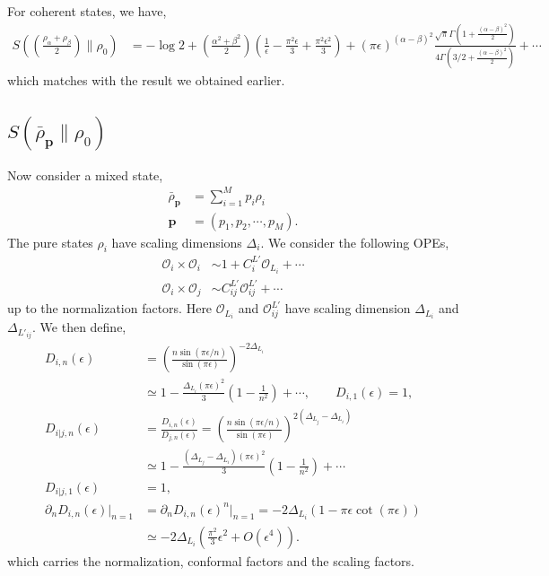 \documentclass[11pt]{article}
\newcommand{\ep}{\epsilon}
\newcommand{\p}{\partial}
\newcommand{\mO}{\mathcal{O}}
\newcommand{\lb}{\left(}
\newcommand{\rb}{\right)}
\begin{document}
For coherent states, we have,
\begin{align}
    S\lb \lb\frac{\rho_\alpha + \rho_\beta}{2}\rb\Big\| \rho_0\rb &= -\log 2+ \lb\frac{\alpha^2 + \beta^2}{2}\rb \lb\frac{1}{\ep} - \frac{\pi^2\ep}{3} + \frac{\pi^2\ep^2}{3} \rb + \lb\pi \ep\rb^{(\alpha-\beta)^2} \frac{\sqrt \pi \Gamma\lb1+\frac{(\alpha-\beta)^2}{2}\rb}{4\Gamma\lb3/2 + \frac{(\alpha-\beta)^2}{2}\rb}+\cdots
\end{align}
which matches with the result we obtained earlier.

\subsection{\texorpdfstring{$S(\bar{\rho}_\textbf{p}\| \rho_0)$}{S rho bar wrt vacuum}}
Now consider a mixed state, 
\begin{align}
    \bar{\rho}_\textbf{p} &= \sum_{i=1}^M p_i \rho_i \\
    \textbf{p}&= (p_1,p_2,\cdots, p_M).
\end{align}
The pure states $\rho_i$ have scaling dimensions $\Delta_i$. We consider the following OPEs,
\begin{align}
    \mO_i \times \mO_i &\sim 1+ C_i^{L'} \mO_{L_i} +\cdots \\
    \mO_i \times \mO_j &\sim C_{ij}^{L'} \mO_{ij}^{L'} + \cdots
\end{align}
up to the normalization factors. Here $\mO_{L_i}$ and $\mO_{ij}^{L'}$ have scaling dimension $\Delta_{L_i}$ and $\Delta_{L'_{ij}}$. We then define,
\begin{align}
    D_{i,n}(\ep) &= \lb\frac{n\sin (\pi\ep/n)}{\sin(\pi\ep)}\rb^{-2\Delta_{L_i}} \\
    &\simeq 1-\frac{\Delta_{L_i}(\pi \ep)^2}{3}\lb 1-\frac{1}{n^2}\rb+\cdots 
    ,\qquad D_{i,1}(\ep)=1, \\
    D_{i|j,n}(\ep)&= \frac{D_{i,n}(\ep)}{D_{j,n}(\ep)} =  \lb\frac{n\sin (\pi\ep/n)}{\sin(\pi\ep)}\rb^{2(\Delta_{L_j}-\Delta_{L_i})} \\
    &\simeq 1-\frac{\lb \Delta_{L_j}-\Delta_{L_i}\rb(\pi \ep)^2}{3}\lb 1-\frac{1}{n^2}\rb+\cdots 
    \\
    D_{i|j,1}(\ep)&=1, \\
    \p_n D_{i,n}(\ep)\big|_{n=1} &= \p_n D_{i,n}(\ep)^n\big|_{n=1}=-2\Delta_{L_i} \lb 1-\pi \ep\cot (\pi\ep)\rb \\
    &\simeq -2\Delta_{L_i}\lb\frac{\pi^2}{3}\ep^2 + O(\ep^4)\rb.
\end{align}
which carries the normalization, conformal factors and the scaling factors. 
\end{document}
